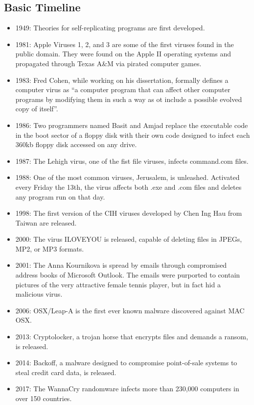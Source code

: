 \documentclass{math}
\begin{document}
\subsection*{Basic Timeline}
\begin{itemize}
  \item 1949: Theories for self-replicating programs are first developed.
  \item 1981: Apple Viruses 1, 2, and 3 are some of the first viruses found in
    the public domain. They were found on the Apple II operating systems and
    propagated through Texas A\&M via pirated computer games.
  \item 1983: Fred Cohen, while working on his dissertation, formally defines a
    computer virus as ``a computer program that can affect other computer
    programs by modifying them in such a way as ot include a possible evolved
    copy of itself''.
  \item 1986: Two programmers named Basit and Amjad replace the executable code
    in the boot sector of a floppy disk with their own code designed to infect
    each 360kb floppy disk accessed on any drive.
  \item 1987: The Lehigh virus, one of the fist file viruses, infects
    command.com files.
  \item 1988: One of the most common viruses, Jerusalem, is unleashed. Activated
    every Friday the 13th, the virus affects both .exe and .com files and
    deletes any program run on that day.
  \item 1998: The first version of the CIH viruses developed by Chen Ing Hau
    from Taiwan are released.
  \item 2000: The virus ILOVEYOU is released, capable of deleting files in
    JPEGs, MP2, or MP3 formats.
  \item 2001: The Anna Kournikova is spread by emails through compromised
    address books of Microsoft Outlook. The emails were purported to contain
    pictures of the very attractive female tennis player, but in fact hid a
    malicious virus.
  \item 2006: OSX/Leap-A is the first ever known malware discovered against
    MAC OSX.
  \item 2013: Cryptolocker, a trojan horse that encrypts files and demands a
    ransom, is released.
  \item 2014: Backoff, a malware designed to compromise point-of-sale systems
    to steal credit card data, is released.
  \item 2017: The WannaCry randomware infects more than 230,000 computers in
    over 150 countries.
\end{itemize}
\end{document}
